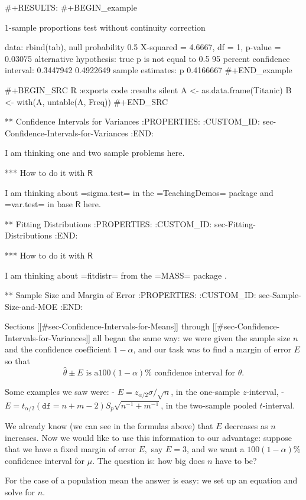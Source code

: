 #+RESULTS:
#+BEGIN_example

	1-sample proportions test without continuity correction

data:  rbind(tab), null probability 0.5
X-squared = 4.6667, df = 1, p-value = 0.03075
alternative hypothesis: true p is not equal to 0.5
95 percent confidence interval:
 0.3447942 0.4922649
sample estimates:
        p 
0.4166667
#+END_example

#+BEGIN_SRC R :exports code :results silent
A <- as.data.frame(Titanic)
B <- with(A, untable(A, Freq))
#+END_SRC

** Confidence Intervals for Variances
:PROPERTIES:
:CUSTOM_ID: sec-Confidence-Intervals-for-Variances
:END:

I am thinking one and two sample problems here.

*** How to do it with \(\mathsf{R}\)

I am thinking about =sigma.test= in the =TeachingDemos= package
\cite{TeachingDemos} and =var.test= in base \(\mathsf{R}\) \cite{base}
here.

** Fitting Distributions
:PROPERTIES:
:CUSTOM_ID: sec-Fitting-Distributions
:END:

*** How to do it with \(\mathsf{R}\)

I am thinking about =fitdistr= from the =MASS= package \cite{MASS}.

** Sample Size and Margin of Error
:PROPERTIES:
:CUSTOM_ID: sec-Sample-Size-and-MOE
:END:

Sections [[#sec-Confidence-Intervals-for-Means]] through [[#sec-Confidence-Intervals-for-Variances]] all began the same way: we were given the sample size
\(n\) and the confidence coefficient \(1-\alpha\), and our task was to
find a margin of error \(E\) so that \[ \hat{\theta}\pm E\mbox{ is a
}100(1-\alpha)\%\mbox{ confidence interval for }\theta.  \]

Some examples we saw were:
- \(E=z_{\alpha/2}\sigma/\sqrt{n}\), in the one-sample \(z\)-interval,
- \(E=t_{\alpha/2}(\mathtt{df}=n+m-2)S_{p}\sqrt{n^{-1}+m^{-1}}\), in
  the two-sample pooled \(t\)-interval.

We already know (we can see in the formulas above) that \(E\)
decreases as \(n\) increases. Now we would like to use this
information to our advantage: suppose that we have a fixed margin of
error \(E,\) say \(E=3\), and we want a \(100(1-\alpha)\%\) confidence
interval for \(\mu\). The question is: how big does \(n\) have to be?

For the case of a population mean the answer is easy: we set up an
equation and solve for \(n\).

